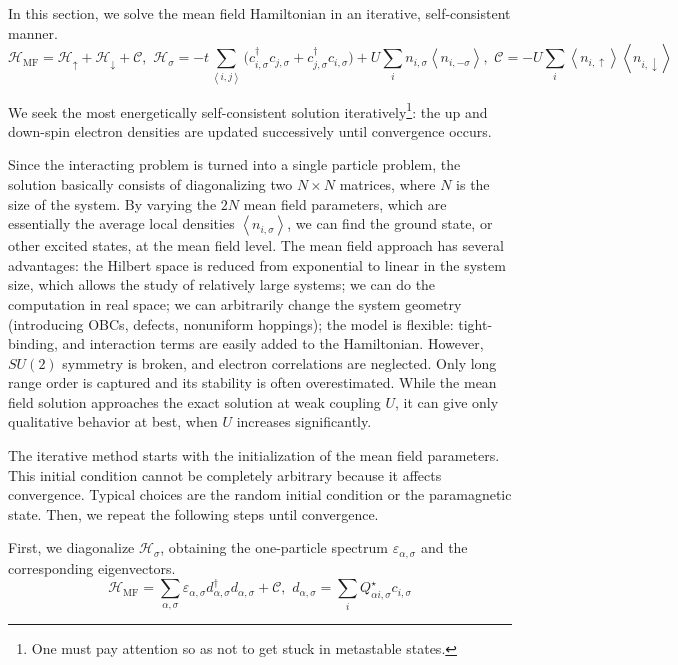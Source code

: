 In this section, we solve the mean field Hamiltonian in an iterative, self-consistent manner.
\begin{equation}
\mathcal{H}_{\text{MF}} = \mathcal{H}_\uparrow + \mathcal{H}_\downarrow + \mathcal{C} , \,\, \mathcal{H}_\sigma = - t \sum_{\left\langle i, j \right\rangle} \bigg( c_{i,\sigma}^\dagger c_{j,\sigma} + c_{j,\sigma}^\dagger c_{i,\sigma} \bigg) + U \sum_i n_{i,\sigma} \left\langle n_{i,-\sigma} \right\rangle , \,\, \mathcal{C} = - U \sum_i \left\langle n_{i,\uparrow} \right\rangle \left\langle n_{i,\downarrow} \right\rangle
\end{equation}

We seek the most energetically self-consistent solution iteratively\footnote{One must pay attention so as not to get stuck in metastable states.}: the up and down-spin electron densities are updated successively until convergence occurs.

Since the interacting problem is turned into a single particle problem, the solution basically consists of diagonalizing two $N \times N$ matrices, where $N$ is the size of the system.
By varying the $2N$ mean field parameters, which are essentially the average local densities $\left\langle n_{i,\sigma} \right\rangle$, we can find the ground state, or other excited states, at the mean field level.
The mean field approach has several advantages: the Hilbert space is reduced from exponential to linear in the system size, which allows the study of relatively large systems; we can do the computation in real space; we can arbitrarily change the system geometry (introducing \acp{OBC}, defects, nonuniform hoppings); the model is flexible: tight-binding, and interaction terms are easily added to the Hamiltonian.
However, $SU(2)$ symmetry is broken, and electron correlations are neglected.
Only long range order is captured and its stability is often overestimated.
While the mean field solution approaches the exact solution at weak coupling $U$, it can give only qualitative behavior at best, when $U$ increases significantly.

The iterative method starts with the initialization of the mean field parameters.
This initial condition cannot be completely arbitrary because it affects convergence.
Typical choices are the random initial condition or the paramagnetic state.
Then, we repeat the following steps until convergence.

First, we diagonalize $\mathcal{H}_\sigma$, obtaining the one-particle spectrum $\varepsilon_{\alpha, \sigma}$ and the corresponding eigenvectors.
\begin{equation}
\mathcal{H}_{\text{MF}} = \sum_{\alpha, \sigma} \varepsilon_{\alpha, \sigma} d_{\alpha, \sigma}^\dagger d_{\alpha, \sigma} + \mathcal{C} , \,\, d_{\alpha, \sigma} = \sum_i Q_{\alpha i, \sigma}^\star c_{i,\sigma}
\end{equation}

